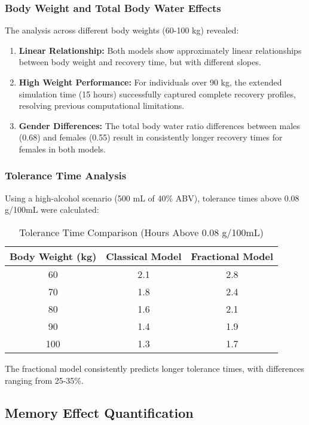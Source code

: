 \documentclass[12pt]{article}
\begin{document}
\subsubsection{Body Weight and Total Body Water Effects}

The analysis across different body weights (60-100 kg) revealed:

\begin{enumerate}
    \item \textbf{Linear Relationship:} Both models show approximately linear relationships between body weight and recovery time, but with different slopes.
    
    \item \textbf{High Weight Performance:} For individuals over 90 kg, the extended simulation time (15 hours) successfully captured complete recovery profiles, resolving previous computational limitations.
    
    \item \textbf{Gender Differences:} The total body water ratio differences between males (0.68) and females (0.55) result in consistently longer recovery times for females in both models.
\end{enumerate}

\subsubsection{Tolerance Time Analysis}

Using a high-alcohol scenario (500 mL of 40\% ABV), tolerance times above 0.08 g/100mL were calculated:

\begin{table}[H]
\centering
\caption{Tolerance Time Comparison (Hours Above 0.08 g/100mL)}
\begin{tabular}{@{}ccc@{}}
\toprule
Body Weight (kg) & Classical Model & Fractional Model \\ \midrule
60 & 2.1 & 2.8 \\
70 & 1.8 & 2.4 \\
80 & 1.6 & 2.1 \\
90 & 1.4 & 1.9 \\
100 & 1.3 & 1.7 \\ \bottomrule
\end{tabular}
\end{table}

The fractional model consistently predicts longer tolerance times, with differences ranging from 25-35\%.

\subsection{Memory Effect Quantification}
\end{document}
